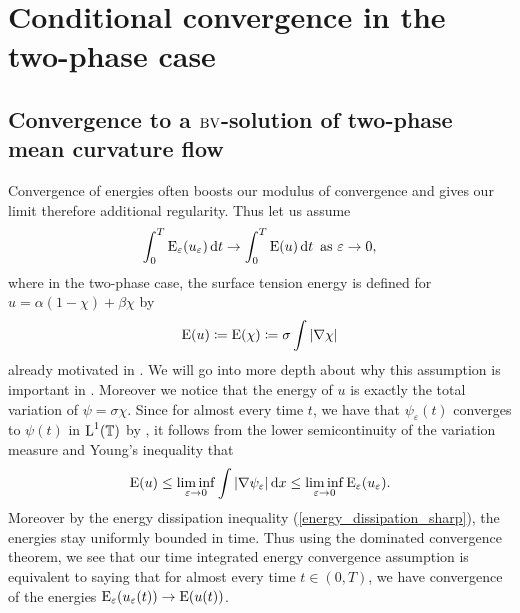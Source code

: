 \section{Conditional convergence in the two-phase case}

\subsection{Convergence to a $\operatorname{BV}$-solution of two-phase mean curvature flow}

Convergence of energies often boosts our 
modulus of convergence and gives our limit therefore additional regularity. 
Thus let us assume 
\begin{equation}
	\label{energy_convergence}
	\int_{ 0 }^{ T }
	\operatorname{E}_{ \varepsilon } ( u_{ \varepsilon } ) 
	\dd{ t }
	\to 
	\int_{ 0 }^{ T }
	\operatorname{E} ( u )
	\dd{ t }
	\text{ as }
	\varepsilon \to 0,
\end{equation}
where in the two-phase case, the surface tension energy is defined for $ u = 
\alpha ( 1 - \chi ) + 
\beta \chi $ by 
\begin{equation}
	\operatorname{E} ( u ) 
	\coloneqq
	\operatorname{E} ( \chi )
	\coloneqq
	\sigma \int \abs{ \nabla \chi }
\end{equation}
already motivated in . We will go into more depth about why 
this assumption is important in 
.
Moreover we notice that the energy of $ u $ is exactly the total variation of $ 
\psi = \sigma \chi $.
Since for almost every time $ t $, we have that $ \psi_{ \varepsilon } ( t ) $ 
converges to $ \psi ( t ) $ in $ \operatorname{L}^{ 1 }  ( \operatorname{\mathbb{T}} ) $ by 
, it follows from the lower semicontinuity of 
the variation measure and Young's inequality that
\begin{equation*}
	\operatorname{E} ( u ) 
	\leq
	\liminf_{ \varepsilon \to 0 }
	\int
	\abs{ \nabla \psi_{ \varepsilon } }
	\dd{ x }
	\leq
	\liminf_{ \varepsilon \to 0 }
	\operatorname{E}_{ \varepsilon } ( u_{ \varepsilon } ).
\end{equation*}
Moreover by the energy dissipation inequality (\ref{energy_dissipation_sharp}), 
the energies stay uniformly bounded in time. Thus using the dominated 
convergence theorem, we see that our time integrated energy convergence 
assumption is equivalent to saying that for almost every time $ t \in ( 0, T ) 
$, we have convergence of the energies $ \operatorname{E}_{ \varepsilon } ( u_{ 
\varepsilon } ( t ) ) \to \operatorname{E} ( u ( t ) ) $.

